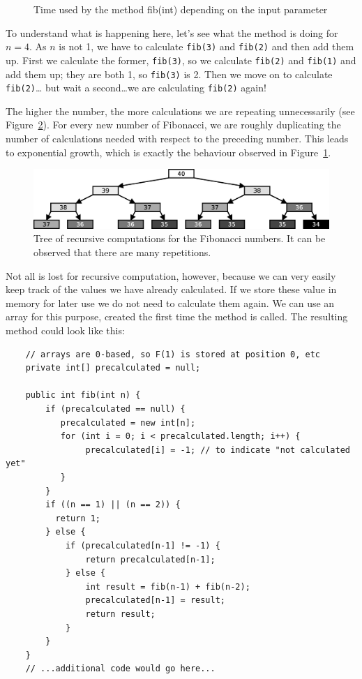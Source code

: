 \begin{figure}[hbtp]
  \centering
  
  \caption{Time used by the method fib(int) depending on the input parameter}
  \label{fig:fibotime}
\end{figure}

To understand what is happening here, let's see what the method is
doing for $n = 4$. As $n$ is not 1, 
we have to calculate \verb+fib(3)+ and \verb+fib(2)+
and then add them up. First we calculate the former, \verb+fib(3)+, so
we calculate \verb+fib(2)+ and \verb+fib(1)+ and add them up; they are both 1, so
\verb+fib(3)+ is 2. Then we move on to calculate \verb+fib(2)+\ldots
but wait a second\ldots we are calculating \verb+fib(2)+ again! 

The higher the number, the more calculations we are repeating
unnecessarily (see Figure~\ref{fig:fibotree}). For every new number of
Fibonacci, we are roughly duplicating the number of calculations
needed with respect to the preceding number. This leads to exponential
growth, which is exactly the behaviour observed in
Figure~\ref{fig:fibotime}. 

\begin{figure}[hbtp]
  \centering
  \includegraphics[width=\textwidth]{gfx/factorial-tree}
  \caption{Tree of recursive computations for the Fibonacci numbers. It can be observed that there are many repetitions. }
  \label{fig:fibotree}
\end{figure}

Not all is lost for recursive computation, however, because we can
very easily keep track of the values we have already calculated. If we
store these value in memory for later use we do not need to calculate
them again. We can use an array for this purpose, created the first
time the method is called. The resulting method could look like this: 

\begin{verbatim}
    // arrays are 0-based, so F(1) is stored at position 0, etc
    private int[] precalculated = null;

    public int fib(int n) {
        if (precalculated == null) {
           precalculated = new int[n];
           for (int i = 0; i < precalculated.length; i++) {
                precalculated[i] = -1; // to indicate "not calculated yet"
           }
        }
        if ((n == 1) || (n == 2)) {
          return 1; 
        } else {
            if (precalculated[n-1] != -1) {
                return precalculated[n-1];
            } else {
                int result = fib(n-1) + fib(n-2);
                precalculated[n-1] = result;
                return result;
            }
        }
    }
    // ...additional code would go here...
\end{verbatim}

